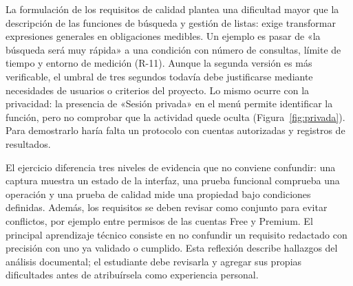 La formulación de los requisitos de calidad plantea una dificultad mayor que la descripción de las funciones de búsqueda y gestión de listas: exige transformar expresiones generales en obligaciones medibles. Un ejemplo es pasar de «la búsqueda será muy rápida» a una condición con número de consultas, límite de tiempo y entorno de medición (R-11). Aunque la segunda versión es más verificable, el umbral de tres segundos todavía debe justificarse mediante necesidades de usuarios o criterios del proyecto. Lo mismo ocurre con la privacidad: la presencia de «Sesión privada» en el menú permite identificar la función, pero no comprobar que la actividad quede oculta (Figura~\ref{fig:privada}). Para demostrarlo haría falta un protocolo con cuentas autorizadas y registros de resultados.

El ejercicio diferencia tres niveles de evidencia que no conviene confundir: una captura muestra un estado de la interfaz, una prueba funcional comprueba una operación y una prueba de calidad mide una propiedad bajo condiciones definidas. Además, los requisitos se deben revisar como conjunto para evitar conflictos, por ejemplo entre permisos de las cuentas Free y Premium. El principal aprendizaje técnico consiste en no confundir un requisito redactado con precisión con uno ya validado o cumplido. Esta reflexión describe hallazgos del análisis documental; el estudiante debe revisarla y agregar sus propias dificultades antes de atribuírsela como experiencia personal.
